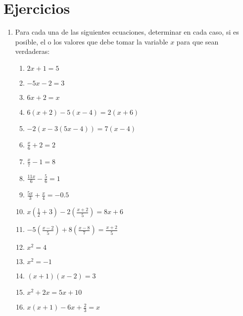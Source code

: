 \documentclass{article}
\begin{document}
\section*{Ejercicios}
\begin{enumerate}[label=\textsc{\roman*}.]
    \item Para cada una de las siguientes ecuaciones, determinar en cada caso, si es posible, el o los valores que debe tomar la variable $x$ para que sean verdaderas:
        \begin{enumerate}[label=\arabic*.]
            \item $2x + 1 = 5$                                              %
            \item $-5x - 2 = 3$                                             %
            \item $6x + 2 = x$                                              %
            \item $6(x+2)-5(x-4) = 2(x+6)$                                  %
            \item $-2 (x - 3(5x - 4)) = 7(x-4)$                             %
            \item $\frac{x}{6}+2 = 2$                                       %
            \item $\frac{x}{7}-1 = 8$                                       %
            \item $\frac{11x}{6} - \frac{5}{6} = 1$                         %
            \item $\frac{5x}{3} + \frac{x}{4} = -0.5$                       %
            \item $x (\frac{1}{2}+3) - 2(\frac{x+2}{5}) = 8x+6$             %
            \item $-5(\frac{x-2}{5}) + 8(\frac{x-8}{7}) = \frac{x+2}{5}$    %
            \item $x^2 = 4$                                                 %
            \item $x^2 = -1$                                                %
            \item $(x+1)(x-2) = 3$                                          %
            \item $x^2 + 2x = 5x + 10$                                      %
            \item $x(x+1) - 6x + \frac{2}{3} = x$                           %
        \end{enumerate}
    

\end{enumerate}
\end{document}
